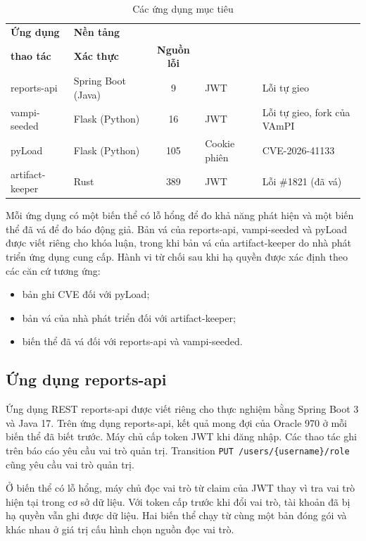\begin{table}[htbp]
  \centering
  \caption{Các ứng dụng mục tiêu}
  \label{tab:benchmark_targets}
  \begin{tabularx}{\textwidth}{@{}l l c l >{\raggedright\arraybackslash}X@{}}
    \toprule
    \textbf{Ứng dụng} & \textbf{Nền tảng} & \makecell[b]{\textbf{Số}\\\textbf{thao tác}} & \textbf{Xác thực} & \textbf{Nguồn lỗi} \\
    \midrule
    reports-api & Spring Boot (Java) & 9 & JWT & Lỗi tự gieo \\
    vampi-seeded & Flask (Python) & 16 & JWT & Lỗi tự gieo, fork của VAmPI \\
    pyLoad & Flask (Python) & 105 & Cookie phiên & \mbox{CVE-2026-41133} \\
    artifact-keeper & Rust & 389 & JWT & Lỗi \#1821 (đã vá) \\
    \bottomrule
  \end{tabularx}
\end{table}

Mỗi ứng dụng có một biến thể có lỗ hổng để đo khả năng phát hiện và một biến thể đã vá để đo báo động giả. Bản vá của reports-api, vampi-seeded và pyLoad được viết riêng cho khóa luận, trong khi bản vá của artifact-keeper do nhà phát triển ứng dụng cung cấp. Hành vi từ chối sau khi hạ quyền được xác định theo các căn cứ tương ứng:
\begin{itemize}
    \item bản ghi CVE đối với pyLoad;
    \item bản vá của nhà phát triển đối với artifact-keeper;
    \item biến thể đã vá đối với reports-api và vampi-seeded.
\end{itemize}

\subsection{Ứng dụng reports-api}
\label{subsec:impl_reports}

Ứng dụng REST reports-api được viết riêng cho thực nghiệm bằng Spring Boot 3 và Java 17. Trên ứng dụng reports-api, kết quả mong đợi của Oracle 970 ở mỗi biến thể đã biết trước. Máy chủ cấp token JWT khi đăng nhập. Các thao tác ghi trên báo cáo yêu cầu vai trò quản trị. Transition \texttt{PUT /users/\{username\}/role} cũng yêu cầu vai trò quản trị.

Ở biến thể có lỗ hổng, máy chủ đọc vai trò từ claim của JWT thay vì tra vai trò hiện tại trong cơ sở dữ liệu. Với token cấp trước khi đổi vai trò, tài khoản đã bị hạ quyền vẫn ghi được dữ liệu. Hai biến thể chạy từ cùng một bản đóng gói và khác nhau ở giá trị cấu hình chọn nguồn đọc vai trò.

